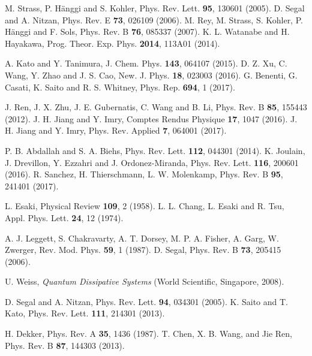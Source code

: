 \documentclass[twocolumn,preprintnumbers,amsmath,amssymb]{revtex4}
\begin{document}
\begin{thebibliography}{99}
 M. Strass, P. H\"{a}nggi and S. Kohler, Phys. Rev. Lett. \textbf{95}, 130601 (2005).
 D. Segal and A. Nitzan, Phys. Rev. E \textbf{73}, 026109 (2006).
 M. Rey, M. Strass, S. Kohler, P. H\"{a}nggi and F. Sols, Phys. Rev. B \textbf{76}, 085337 (2007).
 K. L. Watanabe and H. Hayakawa, Prog. Theor. Exp. Phys. \textbf{2014}, 113A01 (2014).

 A. Kato and Y. Tanimura, J. Chem. Phys. \textbf{143}, 064107 (2015).
 D. Z. Xu, C. Wang, Y. Zhao and J. S. Cao, New. J. Phys. \textbf{18}, 023003 (2016).
 G. Benenti, G. Casati, K. Saito and R. S. Whitney, Phys. Rep. \textbf{694}, 1 (2017).

 J. Ren, J. X. Zhu, J. E. Gubernatis, C. Wang and B. Li, Phys. Rev. B \textbf{85}, 155443 (2012).
 J. H. Jiang and Y. Imry, Comptes Rendus Physique \textbf{17}, 1047 (2016).
 J. H. Jiang and Y. Imry, Phys. Rev. Applied \textbf{7}, 064001 (2017).

 P. B. Abdallah and S. A. Biehs, Phys. Rev. Lett. \textbf{112}, 044301 (2014).
 K. Joulain, J. Drevillon, Y. Ezzahri and J. Ordonez-Miranda, Phys. Rev. Lett. \textbf{116}, 200601 (2016).
 R. Sanchez, H. Thierschmann, L. W. Molenkamp, Phys. Rev. B \textbf{95}, 241401 (2017).

 L. Esaki, Physical Review \textbf{109}, 2 (1958).
 L. L. Chang, L. Esaki and R. Tsu, Appl. Phys. Lett. \textbf{24}, 12 (1974).

 A. J. Leggett, S. Chakravarty, A. T. Dorsey, M. P. A. Fisher, A. Garg, W. Zwerger,
Rev. Mod. Phys. \textbf{59}, 1 (1987).
 D. Segal, Phys. Rev. B \textbf{73}, 205415 (2006).

 U. Weiss, \emph{Quantum Dissipative Systems} (World Scientific, Singapore, 2008).

 D. Segal and A. Nitzan, Phys. Rev. Lett. \textbf{94}, 034301 (2005).
 K. Saito and T. Kato, Phys. Rev. Lett. \textbf{111}, 214301 (2013).


 H. Dekker, Phys. Rev. A \textbf{35}, 1436 (1987).
 T. Chen, X. B. Wang, and Jie Ren, Phys. Rev. B \textbf{87}, 144303 (2013).


\end{thebibliography}
\end{document}
